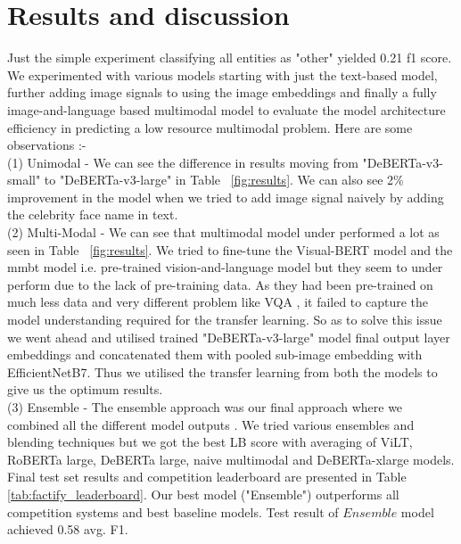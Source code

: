 \documentclass[11pt]{article}
\begin{document}
\section{Results and discussion}
Just the simple experiment classifying all entities as "other" yielded 0.21 f1 score. We experimented with various models starting with just the text-based model, further adding image signals to using the image embeddings and finally a fully image-and-language based multimodal model to evaluate the model architecture efficiency in predicting a low resource multimodal problem. Here are some observations :-\\
(1) Unimodal - We can see the difference in results moving from "DeBERTa-v3-small" to "DeBERTa-v3-large" in Table ~\ref{fig:results}. We can also see 2\% improvement in the model when we tried to add image signal naively by adding the celebrity face name in text. \\
(2) Multi-Modal -  We can see that multimodal model under performed a lot as seen in  Table ~\ref{fig:results}.  We tried to fine-tune the Visual-BERT model and the mmbt model i.e. pre-trained vision-and-language model but they seem to under perform due to the lack of pre-training data. As they had been pre-trained on much less data and very different problem like VQA , it failed to capture the model understanding required for the transfer learning. So as to solve this issue we went ahead and utilised trained "DeBERTa-v3-large" model final output layer embeddings and concatenated them with pooled sub-image embedding with EfficientNetB7. Thus we utilised the transfer learning from both the models to give us the optimum results.\\
(3) Ensemble - The ensemble approach was our final approach where we combined all the different model outputs . We tried various ensembles and blending techniques but we got the best LB score with averaging of ViLT, RoBERTa large, DeBERTa large, naive multimodal and DeBERTa-xlarge models.
Final test set results and competition leaderboard are presented in Table \ref{tab:factify_leaderboard}. Our best model ("Ensemble") outperforms all competition systems and best baseline models. Test result of $Ensemble$ model achieved 0.58 avg. F1.

\end{document}
